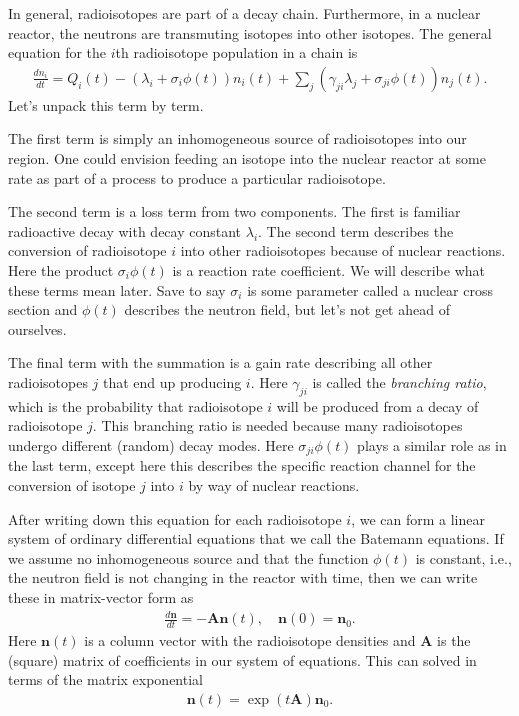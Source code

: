 In general, radioisotopes are part of a decay chain. Furthermore, in a nuclear reactor, the neutrons are transmuting isotopes into other isotopes. The general equation for the $i$th radioisotope population in a chain is
\begin{align}
  \frac{dn_i}{dt} = Q_i(t) - ( \lambda_i + \sigma_i \phi(t) ) n_i(t) + \sum_j ( \gamma_{ji} \lambda_j + \sigma_{ji} \phi(t) ) n_j(t) .
\end{align}
Let's unpack this term by term.

The first term is simply an inhomogeneous source of radioisotopes into our region. One could envision feeding an isotope into the nuclear reactor at some rate as part of a process to produce a particular radioisotope.

The second term is a loss term from two components. The first is familiar radioactive decay with decay constant $\lambda_i$. The second term describes the conversion of radioisotope $i$ into other radioisotopes because of nuclear reactions. Here the product $\sigma_i \phi(t)$ is a reaction rate coefficient. We will describe what these terms mean later. Save to say $\sigma_i$ is some parameter called a nuclear cross section and $\phi(t)$ describes the neutron field, but let's not get ahead of ourselves.

The final term with the summation is a gain rate describing all other radioisotopes $j$ that end up producing $i$. Here $\gamma_{ji}$ is called the \emph{branching ratio}, which is the probability that radioisotope $i$ will be produced from a decay of radioisotope $j$. This branching ratio is needed because many radioisotopes undergo different (random) decay modes. Here $\sigma_{ji} \phi(t)$ plays a similar role as in the last term, except here this describes the specific reaction channel for the conversion of isotope $j$ into $i$ by way of nuclear reactions.

After writing down this equation for each radioisotope $i$, we can form a linear system of ordinary differential equations that we call the Batemann equations. If we assume no inhomogeneous source and that the function $\phi(t)$ is constant, i.e., the neutron field is not changing in the reactor with time, then we can write these in matrix-vector form as
\begin{align}
  \frac{d \mathbf{n}}{dt} = -\mathbf{A} \mathbf{n}(t), \quad \mathbf{n}(0) = \mathbf{n}_0.
\end{align}
Here $\mathbf{n}(t)$ is a column vector with the radioisotope densities and $\mathbf{A}$ is the (square) matrix of coefficients in our system of equations. This can solved in terms of the matrix exponential
\begin{align}
  \mathbf{n}(t) = \exp( t \mathbf{A} ) \mathbf{n}_0 .
\end{align}

